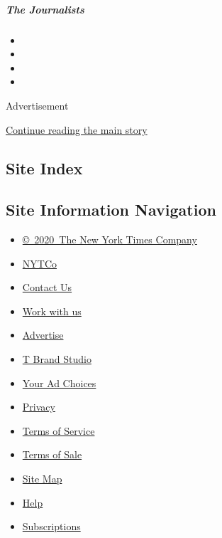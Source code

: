 \href{/interactive/2020/04/13/t-magazine/foreign-correspondents.html}{}

\hypertarget{the-journalists}{%
\subparagraph{The Journalists}\label{the-journalists}}

\begin{itemize}
\item
\item
\item
\item
\end{itemize}

Advertisement

\protect\hyperlink{after-bottom}{Continue reading the main story}

\hypertarget{site-index}{%
\subsection{Site Index}\label{site-index}}

\hypertarget{site-information-navigation}{%
\subsection{Site Information
Navigation}\label{site-information-navigation}}

\begin{itemize}
\tightlist
\item
  \href{https://help.nytimes3xbfgragh.onion/hc/en-us/articles/115014792127-Copyright-notice}{©~2020~The
  New York Times Company}
\end{itemize}

\begin{itemize}
\tightlist
\item
  \href{https://www.nytco.com/}{NYTCo}
\item
  \href{https://help.nytimes3xbfgragh.onion/hc/en-us/articles/115015385887-Contact-Us}{Contact
  Us}
\item
  \href{https://www.nytco.com/careers/}{Work with us}
\item
  \href{https://nytmediakit.com/}{Advertise}
\item
  \href{http://www.tbrandstudio.com/}{T Brand Studio}
\item
  \href{https://www.nytimes3xbfgragh.onion/privacy/cookie-policy\#how-do-i-manage-trackers}{Your
  Ad Choices}
\item
  \href{https://www.nytimes3xbfgragh.onion/privacy}{Privacy}
\item
  \href{https://help.nytimes3xbfgragh.onion/hc/en-us/articles/115014893428-Terms-of-service}{Terms
  of Service}
\item
  \href{https://help.nytimes3xbfgragh.onion/hc/en-us/articles/115014893968-Terms-of-sale}{Terms
  of Sale}
\item
  \href{https://spiderbites.nytimes3xbfgragh.onion}{Site Map}
\item
  \href{https://help.nytimes3xbfgragh.onion/hc/en-us}{Help}
\item
  \href{https://www.nytimes3xbfgragh.onion/subscription?campaignId=37WXW}{Subscriptions}
\end{itemize}
